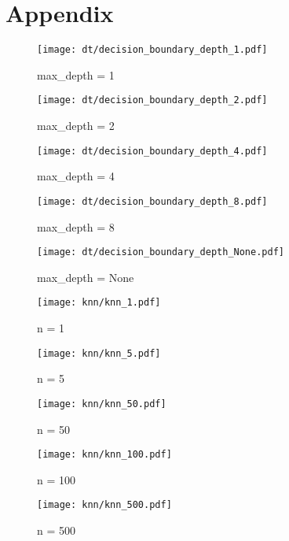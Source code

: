 \documentclass[acmconf,nonacm=true]{acmart}
\begin{document}
\section{Appendix}
\begin{figure}[H]
    \centering  
    \texttt{[image: dt/decision\_boundary\_depth\_1.pdf]}
    \caption{max\_depth = 1}
\end{figure}

\begin{figure}[H]
    \centering
    \texttt{[image: dt/decision\_boundary\_depth\_2.pdf]}
    \caption{max\_depth = 2}
\end{figure}

\begin{figure}[H]
    \centering
    \texttt{[image: dt/decision\_boundary\_depth\_4.pdf]}
    \caption{max\_depth = 4}
\end{figure}

\begin{figure}[H]
    \centering  
    \texttt{[image: dt/decision\_boundary\_depth\_8.pdf]}
    \caption{max\_depth = 8}
\end{figure}

\begin{figure}[H]
    \centering  
    \texttt{[image: dt/decision\_boundary\_depth\_None.pdf]}
    \caption{max\_depth = None}
\end{figure}

\begin{figure}[H]
    \centering
    \texttt{[image: knn/knn\_1.pdf]}
    \caption{n = 1}
\end{figure}

\begin{figure}[H]
    \centering
    \texttt{[image: knn/knn\_5.pdf]}
    \caption{n = 5}
\end{figure}

\begin{figure}[H]
    \centering
    \texttt{[image: knn/knn\_50.pdf]}
    \caption{n = 50}
\end{figure}

\begin{figure}[H]
    \centering
    \texttt{[image: knn/knn\_100.pdf]}
    \caption{n = 100}
\end{figure}

\begin{figure}[H]
    \centering
    \texttt{[image: knn/knn\_500.pdf]}
    \caption{n = 500}
\end{figure}
\end{document}
